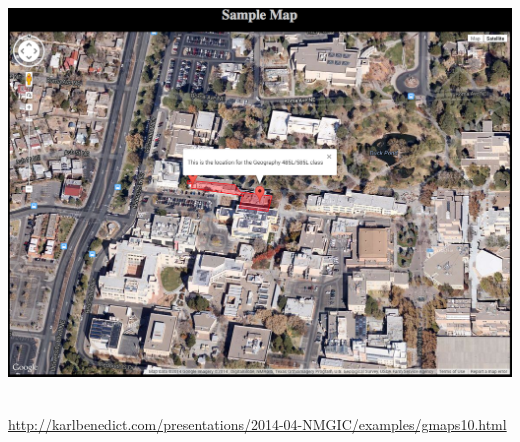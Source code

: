 \documentclass[]{article}
\begin{document}
\includegraphics{images/google_10.jpg}~

\url{http://karlbenedict.com/presentations/2014-04-NMGIC/examples/gmaps10.html}
\end{document}
